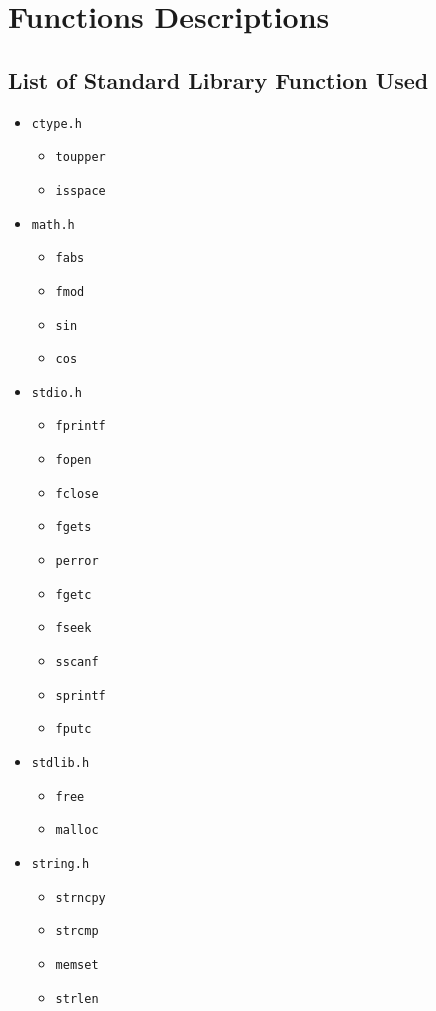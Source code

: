 \documentclass[a4paper, 12pt, titlepage]{article}
\newcommand{\code}[1]{\small\texttt{#1}\normalsize}
\begin{document}
\newpage


\section{Functions Descriptions}

\subsection{List of Standard Library Function Used}

\begin{itemize}[label={--}, noitemsep]
    \item \code{ctype.h}
        \begin{itemize}[label={--}, noitemsep]
            \item \code{toupper}
            \item \code{isspace}
        \end{itemize}
    \item \code{math.h}
        \begin{itemize}[label={--}, noitemsep]
            \item \code{fabs}
            \item \code{fmod}
            \item \code{sin}
            \item \code{cos}
        \end{itemize}
    \item \code{stdio.h}
        \begin{itemize}[label={--}, noitemsep]
            \item \code{fprintf}
            \item \code{fopen}
            \item \code{fclose}
            \item \code{fgets}
            \item \code{perror}
            \item \code{fgetc}
            \item \code{fseek}
            \item \code{sscanf}
            \item \code{sprintf}
            \item \code{fputc}
        \end{itemize}
    \item \code{stdlib.h}
        \begin{itemize}[label={--}, noitemsep]
            \item \code{free}
            \item \code{malloc}
        \end{itemize}
    \item \code{string.h}
        \begin{itemize}[label={--}, noitemsep]
            \item \code{strncpy}
            \item \code{strcmp}
            \item \code{memset}
            \item \code{strlen}
        \end{itemize}
\end{itemize}
\end{document}
